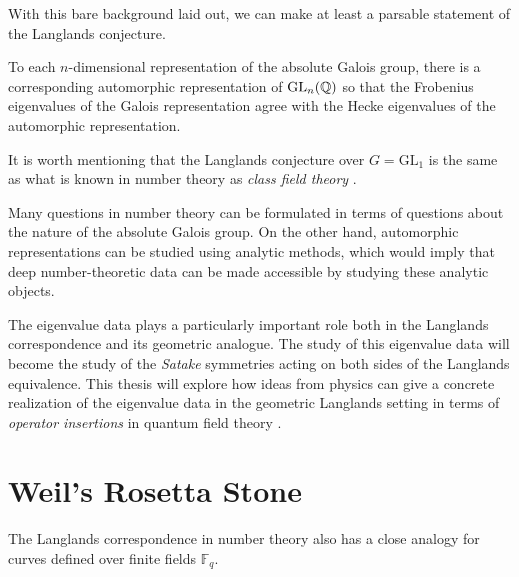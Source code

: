 With this bare background laid out, we can make at least a parsable statement of the Langlands conjecture.

\begin{conj}[Langlands]
	To each $n$-dimensional representation of the absolute Galois group, there is a corresponding automorphic representation of $\mathrm{GL}_n(\mathbb{Q})$ so that the Frobenius eigenvalues of the Galois representation agree with the Hecke eigenvalues of the automorphic representation.
\end{conj}

It is worth mentioning that the Langlands conjecture over $G = \mathrm{GL}_1$ is the same as what is known in number theory as \emph{class field theory} \cite{66515}. 


Many questions in number theory can be formulated in terms of questions about the nature of the absolute Galois group. On the other hand, automorphic representations can be studied using analytic methods, which would imply that deep number-theoretic data can be made accessible by studying these analytic objects.

The eigenvalue data plays a particularly important role both in the Langlands correspondence and its geometric analogue. The study of this eigenvalue data will become the study of the \emph{Satake} symmetries acting on both sides of the Langlands equivalence. This thesis will explore how ideas from physics can give a concrete realization of the eigenvalue data in the geometric Langlands setting in terms of \emph{operator insertions} in quantum field theory \cite{kapustin2006}. 


\section{Weil's Rosetta Stone} %
\label{sec:weil_s_rosetta_stone}

The Langlands correspondence in number theory also has a close analogy for curves defined over finite fields $\mathbb F_q$. %

